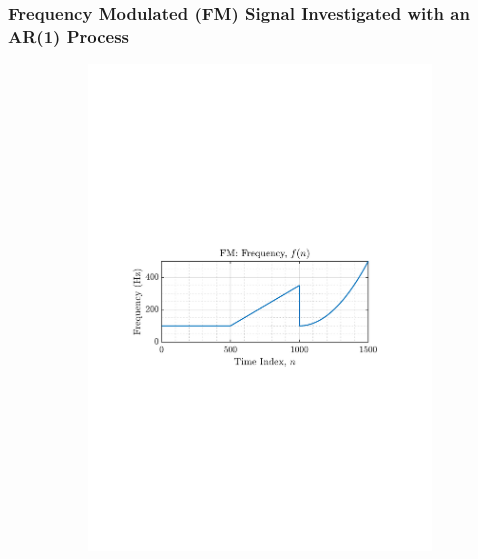 \documentclass[12pt]{article}
\begin{document}
		\subsubsection{Frequency Modulated (FM) Signal Investigated with an AR(1) Process}
			\begin{figure}[H]
				\centering
				\begin{subfigure}{0.49\textwidth}
					\centering
					\includegraphics[trim={2.2cm 11.2cm 3.00cm  11.2cm}, clip, width=\textwidth]{../MATLAB/figures/q3_2a_fig01.pdf} 
					\captionsetup{justification=centering}
				\end{subfigure}
				\begin{subfigure}{0.49\textwidth}
					\centering

\end{subfigure}
\end{figure}
\end{document}
